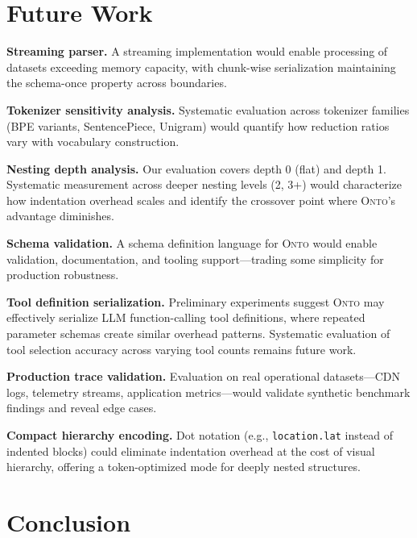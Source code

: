 \documentclass[10pt,twocolumn]{article}
\newcommand{\onto}{\textsc{Onto}\xspace}
\begin{document}
\section{Future Work}

\textbf{Streaming parser.} A streaming implementation would enable processing of datasets exceeding memory capacity, with chunk-wise serialization maintaining the schema-once property across boundaries.

\textbf{Tokenizer sensitivity analysis.} Systematic evaluation across tokenizer families (BPE variants, SentencePiece, Unigram) would quantify how reduction ratios vary with vocabulary construction.

\textbf{Nesting depth analysis.} Our evaluation covers depth 0 (flat) and depth 1. Systematic measurement across deeper nesting levels (2, 3+) would characterize how indentation overhead scales and identify the crossover point where \onto's advantage diminishes.

\textbf{Schema validation.} A schema definition language for \onto would enable validation, documentation, and tooling support---trading some simplicity for production robustness.

\textbf{Tool definition serialization.} Preliminary experiments suggest \onto may effectively serialize LLM function-calling tool definitions, where repeated parameter schemas create similar overhead patterns. Systematic evaluation of tool selection accuracy across varying tool counts remains future work.

\textbf{Production trace validation.} Evaluation on real operational datasets---CDN logs, telemetry streams, application metrics---would validate synthetic benchmark findings and reveal edge cases.

\textbf{Compact hierarchy encoding.} Dot notation (e.g., \texttt{location.lat} instead of indented blocks) could eliminate indentation overhead at the cost of visual hierarchy, offering a token-optimized mode for deeply nested structures.

\section{Conclusion}
\end{document}
